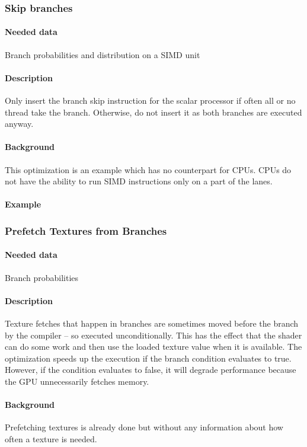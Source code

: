 \subsubsection{Skip branches}
\paragraph{Needed data} Branch probabilities and distribution on a SIMD unit
\paragraph{Description} Only insert the branch skip instruction for the scalar processor if often all or no thread take the branch. Otherwise, do not insert it as both branches are executed anyway.
\paragraph{Background} This optimization is an example which has no counterpart for CPUs. CPUs do not have the ability to run SIMD instructions only on a part of the lanes.
\paragraph{Example}
	
\subsubsection{Prefetch Textures from Branches}
\paragraph{Needed data} Branch probabilities
\paragraph{Description} Texture fetches that happen in branches are sometimes moved before the branch by the compiler -- so executed unconditionally. This has the effect that the shader can do some work and then use the loaded texture value when it is available. The optimization speeds up the execution if the branch condition evaluates to true. However, if the condition evaluates to false, it will degrade performance because the GPU unnecessarily fetches memory.
\paragraph{Background} Prefetching textures is already done but without any information about how often a texture is needed.
